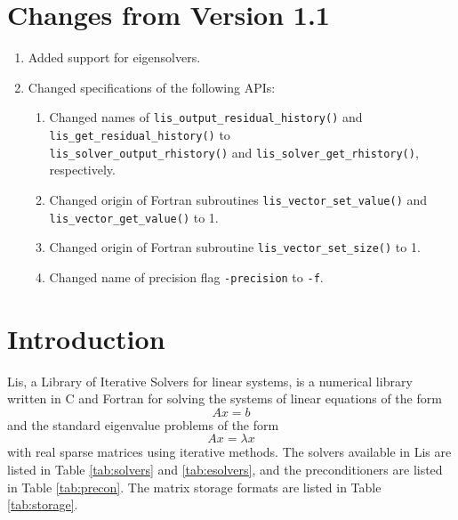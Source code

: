 \documentclass[a4paper]{article}
\begin{document}
\newpage
{}
\tableofcontents
\setcounter{section}{-1}
\newpage
\section{Changes from Version 1.1}
\begin{enumerate}
\item Added support for eigensolvers.
\item Changed specifications of the following APIs:
\begin{enumerate}
\item Changed names of {\tt lis\_output\_residual\_history()} and
      {\tt lis\_get\_residual\_history()} to \\
      {\tt lis\_solver\_output\_rhistory()} and {\tt lis\_solver\_get\_rhistory()}, respectively. 
\item Changed origin of Fortran subroutines {\tt lis\_vector\_set\_value()} and
      {\tt lis\_vector\_get\_value()} to 1.
\item Changed origin of Fortran subroutine {\tt lis\_vector\_set\_size()} to 1. 
\item Changed name of precision flag {\tt -precision} to {\tt -f}.
\end{enumerate}
\end{enumerate}

\newpage
\section{Introduction}
Lis, a Library of Iterative Solvers for linear systems, is a numerical 
library written in C and Fortran for solving the systems of linear equations 
of the form 
\[
 Ax = b
\]
and the standard eigenvalue problems of the form 
\[
 Ax = \lambda x
\]
with real sparse matrices using iterative methods.
The solvers available in Lis are listed in Table \ref{tab:solvers} and
\ref{tab:esolvers}, and the preconditioners are listed in Table \ref{tab:precon}.
The matrix storage formats are listed in Table \ref{tab:storage}.
\end{document}

